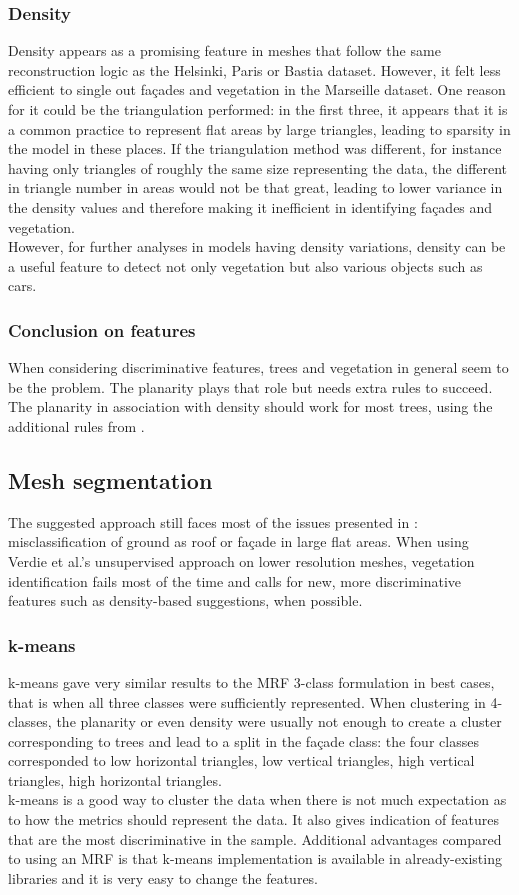 \documentclass{kththesis}
\begin{document}
\subsubsection{Density}
\label{sec:disc_density}
Density appears as a promising feature in meshes that follow the same reconstruction logic as the Helsinki, Paris or Bastia dataset. However, it felt less efficient to single out façades and vegetation in the Marseille dataset. One reason for it could be the triangulation performed: in the first three, it appears that it is a common practice to represent flat areas by large triangles, leading to sparsity in the model in these places. If the triangulation method was different, for instance having only triangles of roughly the same size representing the data, the different in triangle number in areas would not be that great, leading to lower variance in the density values and therefore making it inefficient in identifying façades and vegetation. \\
However, for further analyses in models having density variations, density can be a useful feature to detect not only vegetation but also various objects such as cars. 
\subsubsection{Conclusion on features}
When considering discriminative features, trees and vegetation in general seem to be the problem. The planarity plays that role but needs extra rules to succeed. The planarity in association with density should work for most trees, using the additional rules from \textcite{verdie}.
\subsection{Mesh segmentation}
The suggested approach still faces most of the issues presented in \textcite{rouhani, verdie}: misclassification of ground as roof or façade in large flat areas. When using Verdie et al.'s \parencite{verdie} unsupervised approach on lower resolution meshes, vegetation identification fails most of the time and calls for new, more discriminative features such as density-based suggestions, when possible. \\ 
\subsubsection{k-means}
k-means gave very similar results to the MRF 3-class formulation in best cases, that is when all three classes were sufficiently represented. When clustering in 4-classes, the planarity or even density were usually not enough to create a cluster corresponding to trees and lead to a split in the façade class: the four classes corresponded to low horizontal triangles, low vertical triangles, high vertical triangles, high horizontal triangles. \\
k-means is a good way to cluster the data when there is not much expectation as to how the metrics should represent the data. It also gives indication of features that are the most discriminative in the sample. Additional advantages compared to using an MRF is that k-means implementation is available in already-existing libraries and it is very easy to change the features. 
\end{document}
